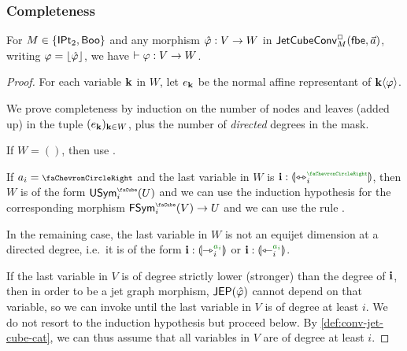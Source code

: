 \documentclass[a4paper]{memoir}
\begin{document}
\subsubsection{Completeness} \label{sec:jetcubes:calculus:completeness}
\begin{theorem}[Completeness] \label{thm:calculus-complete}
	For $M \in \mathopen{}\left\{ {\mathsf{IPt}_2}, \mathsf{Boo} \right\}\mathclose{}$ and any morphism $\hat {\varphi} : V \to W$ in $\mathsf{JetCubeConv}^{\Box}_{M}\mathopen{}\left( {\mathsf{fbe}},\vec a \right)\mathclose{}$, writing $\varphi = \mathopen{}\left\lfloor \hat {\varphi} \right\rfloor\mathclose{}$, we have $\vdash \varphi : V \to W$.
\end{theorem}
\begin{proof}
	For each variable $\mathbf{k}$ in $W$, let $e_{\mathbf{k}}$ be the normal affine representant of $\mathbf{k} \langle \varphi \rangle$.

	We prove completeness by induction on the number of nodes and leaves (added up) in the tuple $(e_{\mathbf{k}})_{\mathbf{k} \in W}$, plus the number of \emph{directed} degrees in the mask.
	
	If $W = ()$, then use .
	
	If $a_i = \ypolar$ and the last variable in $W$ is $\dm i : \rival{\equijet_i\pmr{\ypolar}}$, then $W$ is of the form $\Usymcube_i(U)$ and we can use the induction hypothesis for the corresponding morphism $\Fsymcube_i(V) \to U$ and we can use the rule .
	
	In the remaining case, the last variable in $W$ is not an equijet dimension at a directed degree, i.e.\ it is of the form $\dm i : \rival{\jet_i\pmr{a_i}}$ or $\dm i : \rival{\tej_i\pmr{a_i}}$.
	
	If the last variable in $V$ is of degree strictly lower (stronger) than the degree of $\mathbf{i}$, then in order to be a jet graph morphism, $\mathsf{JEP}(\hat {\varphi})$ cannot depend on that variable, so we can invoke  until the last variable in $V$ is of degree at least $i$. We do not resort to the induction hypothesis but proceed below.
	By \cref{def:conv-jet-cube-cat}, we can thus assume that all variables in $V$ are of degree at least $i$.
	
	

\end{proof}
\end{document}
